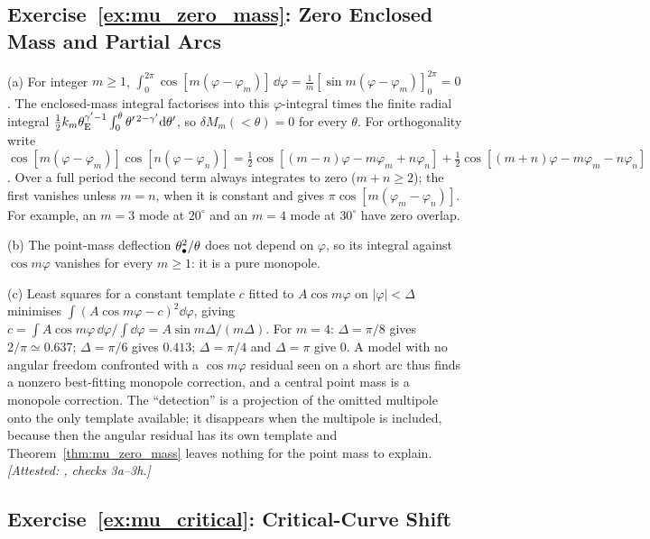 \subsection*{Exercise~\ref{ex:mu_zero_mass}: Zero Enclosed Mass and Partial Arcs}

(a) For integer $m\ge1$,
$\int_0^{2\pi}\cos[m(\varphi-\varphi_m)]\,\dd\varphi
= \tfrac1m[\sin m(\varphi-\varphi_m)]_0^{2\pi} = 0$.  The enclosed-mass
integral factorises into this $\varphi$-integral times the finite
radial integral $\tfrac12 k_m\theta_{\mathrm{E}}^{\gamma'-1}\int_0^\theta
\theta'^{\,2-\gamma'}\dd\theta'$, so $\delta M_m(<\theta)=0$ for every
$\theta$.  For orthogonality write
$\cos[m(\varphi-\varphi_m)]\cos[n(\varphi-\varphi_n)]
= \tfrac12\cos[(m-n)\varphi - m\varphi_m + n\varphi_n]
+ \tfrac12\cos[(m+n)\varphi - m\varphi_m - n\varphi_n]$.  Over a full
period the second term always integrates to zero ($m+n\ge2$); the first
vanishes unless $m=n$, when it is constant and gives
$\pi\cos[m(\varphi_m-\varphi_n)]$.  For example, an $m=3$ mode at
$20^\circ$ and an $m=4$ mode at $30^\circ$ have zero overlap.

(b) The point-mass deflection $\theta_{\bullet}^2/\theta$ does not
depend on $\varphi$, so its integral against $\cos m\varphi$ vanishes for
every $m\ge1$: it is a pure monopole.

(c) Least squares for a constant template $c$ fitted to
$A\cos m\varphi$ on $|\varphi|<\Delta$ minimises
$\int(A\cos m\varphi - c)^2\dd\varphi$, giving
$c = \int A\cos m\varphi\,\dd\varphi/\int\dd\varphi
= A\sin m\Delta/(m\Delta)$.  For $m=4$: $\Delta=\pi/8$ gives $2/\pi
\simeq 0.637$; $\Delta=\pi/6$ gives $0.413$; $\Delta=\pi/4$ and
$\Delta=\pi$ give $0$.  A model with no angular freedom confronted with
a $\cos m\varphi$ residual seen on a short arc thus finds a nonzero
best-fitting monopole correction, and a central point mass is a
monopole correction.  The ``detection'' is a projection of the omitted
multipole onto the only template available; it disappears when the
multipole is included, because then the angular residual has its own
template and Theorem~\ref{thm:mu_zero_mass} leaves nothing for the
point mass to explain.
\emph{[Attested: ,
checks 3a--3h.]}

\subsection*{Exercise~\ref{ex:mu_critical}: Critical-Curve Shift}

